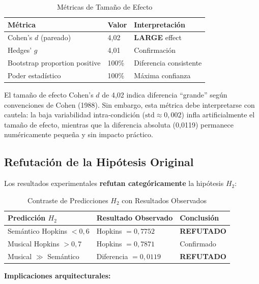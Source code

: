 \begin{table}[htbp]
\centering
\caption{Métricas de Tamaño de Efecto}
\label{tab:tamano-efecto}
\begin{tabular}{lll}
\toprule
\textbf{Métrica} & \textbf{Valor} & \textbf{Interpretación} \\
\midrule
Cohen's $d$ (pareado) & 4,02 & \textbf{LARGE} effect \\
Hedges' $g$ & 4,01 & Confirmación \\
Bootstrap proportion positive & 100\% & Diferencia consistente \\
Poder estadístico & 100\% & Máxima confianza \\
\bottomrule
\end{tabular}
\end{table}

El tamaño de efecto Cohen's $d$ de 4,02 indica diferencia ``grande'' según convenciones de Cohen (1988). Sin embargo, esta métrica debe interpretarse con cautela: la baja variabilidad intra-condición ($\text{std} \approx 0{,}002$) infla artificialmente el tamaño de efecto, mientras que la diferencia absoluta (0,0119) permanece numéricamente pequeña y sin impacto práctico.

\subsection{Refutación de la Hipótesis Original}
\label{subsec:refutacion-hipotesis}

Los resultados experimentales \textbf{refutan categóricamente} la hipótesis $H_2$:

\begin{table}[htbp]
\centering
\caption{Contraste de Predicciones $H_2$ con Resultados Observados}
\label{tab:refutacion-h2}
\begin{tabular}{lll}
\toprule
\textbf{Predicción $H_2$} & \textbf{Resultado Observado} & \textbf{Conclusión} \\
\midrule
Semántico Hopkins $< 0{,}6$ & Hopkins $= 0{,}7752$ & \textbf{REFUTADO} \\
Musical Hopkins $> 0{,}7$ & Hopkins $= 0{,}7871$ & Confirmado \\
Musical $\gg$ Semántico & Diferencia $= 0{,}0119$ & \textbf{REFUTADO} \\
\bottomrule
\end{tabular}
\end{table}

\textbf{Implicaciones arquitecturales:}

